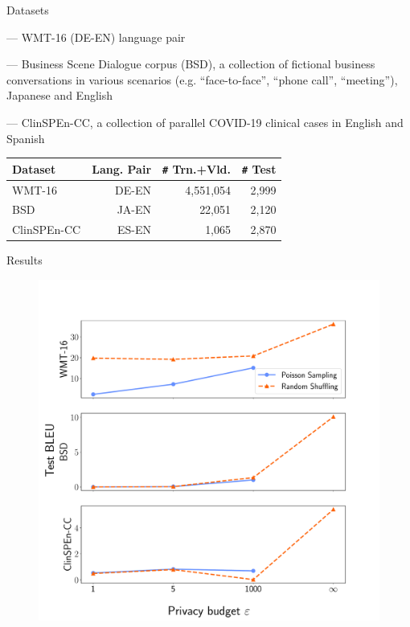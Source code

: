 \documentclass[12pt,aspectratio=169,handout]{beamer}
\begin{document}
\begin{frame}{Datasets}

--- WMT-16 (DE-EN) language pair

--- Business Scene Dialogue corpus (BSD), a collection of fictional business conversations in various scenarios (e.g. “face-to-face”, “phone call”, “meeting”), Japanese and English

--- ClinSPEn-CC, a collection of parallel COVID-19 clinical cases in English and Spanish


\begin{table}
\scriptsize
\begin{tabular}{lr|rr}
\textbf{Dataset} & \textbf{Lang. Pair} & \textbf{\texttt{\#} Trn.+Vld.} & \textbf{\texttt{\#} Test} \\
\hline
WMT-16 & DE-EN & 4,551,054 & 2,999 \\
BSD & JA-EN & 22,051 & 2,120 \\
ClinSPEn-CC & ES-EN & 1,065 & 2,870 \\  %
\end{tabular}
\end{table}



\end{frame}


\begin{frame}{Results}

\begin{figure}
\includegraphics[trim={0 0 3cm 3.5cm},clip,width=0.6\linewidth]{img/results-test-BLEU.pdf}
\end{figure}


\end{frame}
\end{document}
